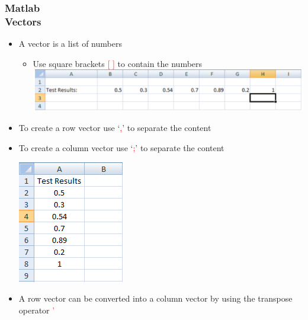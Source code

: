 \documentclass[hyperref={pdfpagelabels=true}]{beamer}
\begin{document}
\begin{frame}
\frametitle{Matlab \\ {\small Vectors}}
\begin{itemize}
\item A vector is a list of numbers
  \begin{itemize}
  \item Use square brackets \textcolor{red}{\large [ ]} to contain the numbers \\ \includegraphics[scale = 0.35]{figs/Selection_015.png}
  \end{itemize}
\item To create a row vector use ‘\textcolor{red}{\huge ,}’ to separate the content
\item To create a column vector use ‘\textcolor{red}{\huge ;}’ to separate the content \\ \begin{center} \includegraphics[scale = 0.35]{figs/Selection_017.png} \end{center}
\item A row vector can be converted into a column vector by using the transpose operator \textcolor{red}{\huge '}
\end{itemize}
\end{frame}
\end{document}
